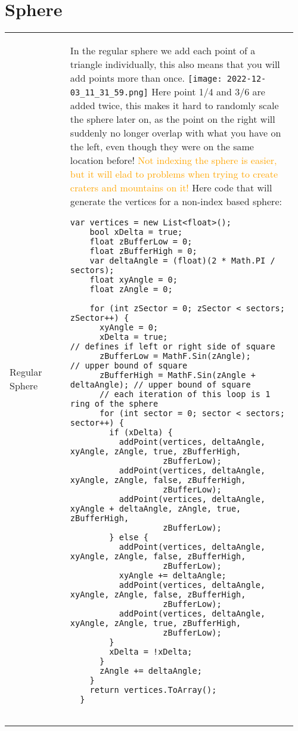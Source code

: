 \documentclass[main.tex,fontsize=8pt,paper=a4,paper=portrait,DIV=calc,]{scrartcl}
\begin{document}
\pagebreak 
\begin{table}[ht!]
\section{Sphere}
\begin{tabular}{|m{0.2\linewidth}|m{0.755\linewidth}|}
\hline
Regular Sphere & 
In the regular sphere we add each point of a triangle individually, this also means that you will add points more than once.\newline
\texttt{[image: 2022-12-03\_11\_31\_59.png]}\newline
Here point 1/4 and 3/6 are added twice, this makes it hard to randomly scale the sphere later on, as the point on the right will suddenly no longer overlap with what you have on the left, even though they were on the same location before!\newline
\textcolor{orange}{Not indexing the sphere is easier, but it will elad to problems when trying to create craters and mountains on it!}\newline
Here code that will generate the vertices for a non-index based sphere:\newline
\begin{lstlisting}
var vertices = new List<float>();
    bool xDelta = true;
    float zBufferLow = 0;
    float zBufferHigh = 0;
    var deltaAngle = (float)(2 * Math.PI / sectors);
    float xyAngle = 0;
    float zAngle = 0;

    for (int zSector = 0; zSector < sectors; zSector++) {
      xyAngle = 0;
      xDelta = true;                                // defines if left or right side of square
      zBufferLow = MathF.Sin(zAngle);               // upper bound of square
      zBufferHigh = MathF.Sin(zAngle + deltaAngle); // upper bound of square
      // each iteration of this loop is 1 ring of the sphere
      for (int sector = 0; sector < sectors; sector++) {
        if (xDelta) {
          addPoint(vertices, deltaAngle, xyAngle, zAngle, true, zBufferHigh,
                   zBufferLow);
          addPoint(vertices, deltaAngle, xyAngle, zAngle, false, zBufferHigh,
                   zBufferLow);
          addPoint(vertices, deltaAngle, xyAngle + deltaAngle, zAngle, true, zBufferHigh,
                   zBufferLow);
        } else {
          addPoint(vertices, deltaAngle, xyAngle, zAngle, false, zBufferHigh,
                   zBufferLow);
          xyAngle += deltaAngle;
          addPoint(vertices, deltaAngle, xyAngle, zAngle, false, zBufferHigh,
                   zBufferLow);
          addPoint(vertices, deltaAngle, xyAngle, zAngle, true, zBufferHigh,
                   zBufferLow);
        }
        xDelta = !xDelta;
      }
      zAngle += deltaAngle;
    }
    return vertices.ToArray();
  }


\end{lstlisting}
\end{tabular}
\end{table}
\end{document}
